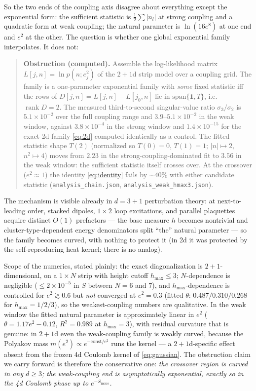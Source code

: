 \documentclass[11pt]{article}
\theoremstyle{remark}
\theoremstyle{plain}
\begin{document}
So the two ends of the coupling axis disagree about everything except the exponential form: the sufficient statistic is $\tfrac12\sum|n_l|$ at strong coupling and a quadratic form at weak coupling; the natural parameter is $\ln(16e^8)$ at one end and $e^2$ at the other. The question is whether one global exponential family interpolates. It does not:

\begin{quote}
\textbf{Obstruction (computed).} Assemble the log-likelihood matrix $L[j, n] = \ln p(n; e^2_j)$ of the $2{+}1$d strip model over a coupling grid. The family is a one-parameter exponential family with \emph{some} fixed statistic iff the rows of $D[j,n] = L[j,n] - L[j_0,n]$ lie in $\mathrm{span}\{\mathbf 1, T\}$, i.e.\ $\operatorname{rank} D = 2$. The measured third-to-second singular-value ratio $\sigma_3/\sigma_2$ is $5.1\times10^{-2}$ over the full coupling range and $3.9$--$5.1\times10^{-2}$ in the weak window, against $3.8\times10^{-4}$ in the strong window and $1.4\times10^{-15}$ for the exact 2d family \eqref{eq:2d} computed identically as a control. The fitted statistic shape $T(2)$ (normalized so $T(0)=0$, $T(1)=1$; $|n| \mapsto 2$, $n^2 \mapsto 4$) moves from $2.23$ in the strong-coupling-dominated fit to $3.56$ in the weak window: the sufficient statistic itself crosses over. At the crossover ($e^2 \approx 1$) the identity \eqref{eq:identity} fails by ${\sim}40\%$ with either candidate statistic (\texttt{analysis\_chain.json}, \texttt{analysis\_weak\_hmax3.json}).
\end{quote}

The mechanism is visible already in $d = 3{+}1$ perturbation theory: at next-to-leading order, stacked dipoles, $1\times2$ loop excitations, and parallel plaquettes acquire distinct $O(1)$ prefactors --- the base measure $h$ becomes nontrivial and cluster-type-dependent energy denominators split ``the'' natural parameter --- so the family becomes curved, with nothing to protect it (in 2d it was protected by the self-reproducing heat kernel; there is no analog).

Scope of the numerics, stated plainly: the exact diagonalization is $2{+}1$-dimensional, on a $1\times N$ strip with height cutoff $h_{\max} \leq 3$; $N$-dependence is negligible ($\leq 2\times10^{-5}$ in $S$ between $N = 6$ and $7$), and $h_{\max}$-dependence is controlled for $e^2 \gtrsim 0.6$ but \emph{not} converged at $e^2 = 0.3$ (fitted $\theta$: $0.487/0.310/0.268$ for $h_{\max} = 1/2/3$), so the weakest-coupling numbers are qualitative. In the weak window the fitted natural parameter is approximately linear in $e^2$ ($\theta = 1.17 e^2 - 0.12$, $R^2 = 0.989$ at $h_{\max} = 3$), with residual curvature that is genuine: in $2{+}1$d even the weak-coupling family is weakly curved, because the Polyakov mass $m(e^2) \propto e^{-\mathrm{const}/e^2}$ runs the kernel \cite{Pol77} --- a $2{+}1$d-specific effect absent from the frozen 4d Coulomb kernel of \eqref{eq:gaussian}. The obstruction claim we carry forward is therefore the conservative one: \emph{the crossover region is curved in any $d \geq 3$; the weak-coupling end is asymptotically exponential, exactly so in the 4d Coulomb phase up to $e^{-S_{\mathrm{mono}}}$.}
\end{document}
